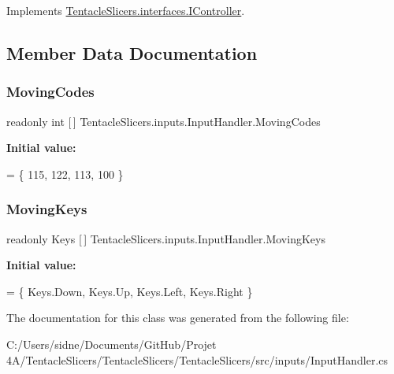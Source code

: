 Implements \hyperlink{interface_tentacle_slicers_1_1interfaces_1_1_i_controller}{Tentacle\+Slicers.\+interfaces.\+I\+Controller}.



\subsection{Member Data Documentation}
\mbox{\label{class_tentacle_slicers_1_1inputs_1_1_input_handler_ab38692312177363ed6a573a92f6da41d}} 
\subsubsection{\texorpdfstring{Moving\+Codes}{MovingCodes}}
{\footnotesize\ttfamily readonly int \mbox{[}$\,$\mbox{]} Tentacle\+Slicers.\+inputs.\+Input\+Handler.\+Moving\+Codes\hspace{0.3cm}{\ttfamily [static]}}

{\bfseries Initial value\+:}
\begin{DoxyCode}
=
        \{
            115,
            122,
            113,
            100
        \}
\end{DoxyCode}
\mbox{\label{class_tentacle_slicers_1_1inputs_1_1_input_handler_a20ec219e4dda2e40baf0c1bf951c931f}} 
\subsubsection{\texorpdfstring{Moving\+Keys}{MovingKeys}}
{\footnotesize\ttfamily readonly Keys \mbox{[}$\,$\mbox{]} Tentacle\+Slicers.\+inputs.\+Input\+Handler.\+Moving\+Keys\hspace{0.3cm}{\ttfamily [static]}}

{\bfseries Initial value\+:}
\begin{DoxyCode}
=
        \{
            Keys.Down,
            Keys.Up,
            Keys.Left,
            Keys.Right
        \}
\end{DoxyCode}


The documentation for this class was generated from the following file\+:\begin{DoxyCompactItemize}
\item 
C\+:/\+Users/sidne/\+Documents/\+Git\+Hub/\+Projet 4\+A/\+Tentacle\+Slicers/\+Tentacle\+Slicers/\+Tentacle\+Slicers/src/inputs/Input\+Handler.\+cs\end{DoxyCompactItemize}
